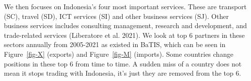 \documentclass[
  letterpaper,
  DIV=11,
  numbers=noendperiod]{scrartcl}
\begin{document}
We then focuses on Indonesia's four most important services. These are
transport (SC), travel (SD), ICT services (SI) and other business
services (SJ). Other business services includes consulting management,
research and development, and trade-related services (Liberatore et al.
2021). We look at top 6 partners in these sectors annually from
2005-2021 as existed in BaTIS, which can be seen in Figure~\ref{fig-X}
(exports) and Figure~\ref{fig-M} (imports). Some countries change
positions in these top 6 from time to time. A sudden miss of a country
does not mean it stops trading with Indonesia, it's just they are
removed from the top 6.

\begin{figure}

\begin{minipage}{0.50\linewidth}



\end{minipage}%
%
\begin{minipage}{0.50\linewidth}

\end{minipage}
\end{figure}
\end{document}
